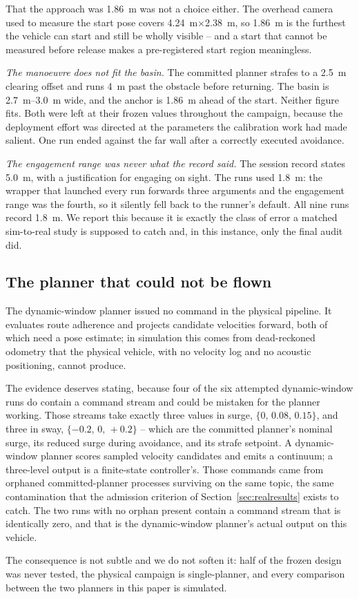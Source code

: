 That the approach was \SI{1.86}{\metre} was not a choice either. The
overhead camera used to measure the start pose covers
\SI{4.24}{\metre}$\times$\SI{2.38}{\metre}, so \SI{1.86}{\metre} is the
furthest the vehicle can start and still be wholly visible -- and a
start that cannot be measured before release makes a pre-registered
start region meaningless.

\emph{The manoeuvre does not fit the basin.} The committed planner
strafes to a \SI{2.5}{\metre} clearing offset and runs \SI{4}{\metre}
past the obstacle before returning. The basin is
\SIrange{2.7}{3.0}{\metre} wide, and the anchor is \SI{1.86}{\metre}
ahead of the start. Neither figure fits. Both were left at their frozen
values throughout the campaign, because the deployment effort was
directed at the parameters the calibration work had made salient. One
run ended against the far wall after a correctly executed avoidance.

\emph{The engagement range was never what the record said.} The session
record states \SI{5.0}{\metre}, with a justification for engaging on
sight. The runs used \SI{1.8}{\metre}: the wrapper that launched every
run forwards three arguments and the engagement range was the fourth, so
it silently fell back to the runner's default. All nine runs record
\SI{1.8}{\metre}. We report this because it is exactly the class of
error a matched sim-to-real study is supposed to catch and, in this
instance, only the final audit did.

\subsection{The planner that could not be flown}

The dynamic-window planner issued no command in the physical pipeline.
It evaluates route adherence and projects candidate velocities forward,
both of which need a pose estimate; in simulation this comes from
dead-reckoned odometry that the physical vehicle, with no velocity log
and no acoustic positioning, cannot produce.

The evidence deserves stating, because four of the six attempted
dynamic-window runs do contain a command stream and could be mistaken
for the planner working. Those streams take exactly three values in
surge, $\{0,\,0.08,\,0.15\}$, and three in sway,
$\{-0.2,\,0,\,+0.2\}$ -- which are the committed planner's nominal
surge, its reduced surge during avoidance, and its strafe setpoint. A
dynamic-window planner scores sampled velocity candidates and emits a
continuum; a three-level output is a finite-state controller's. Those
commands came from orphaned committed-planner processes surviving on the
same topic, the same contamination that the admission criterion of
Section~\ref{sec:realresults} exists to catch. The two runs with no
orphan present contain a command stream that is identically zero, and
that is the dynamic-window planner's actual output on this vehicle.

The consequence is not subtle and we do not soften it: half of the
frozen design was never tested, the physical campaign is
single-planner, and every comparison between the two planners in this
paper is simulated.
